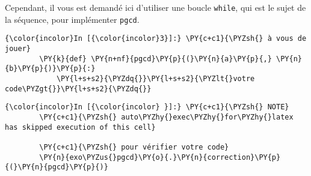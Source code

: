 \begin{Shaded}
\end{Shaded}

Cependant, il vous est demandé ici d'utiliser une boucle \texttt{while},
qui est le sujet de la séquence, pour implémenter \texttt{pgcd}.

    \begin{Verbatim}[commandchars=\\\{\},frame=single,framerule=0.3mm,rulecolor=\color{cellframecolor}]
{\color{incolor}In [{\color{incolor}3}]:} \PY{c+c1}{\PYZsh{} à vous de jouer}
        \PY{k}{def} \PY{n+nf}{pgcd}\PY{p}{(}\PY{n}{a}\PY{p}{,} \PY{n}{b}\PY{p}{)}\PY{p}{:}
            \PY{l+s+s2}{\PYZdq{}}\PY{l+s+s2}{\PYZlt{}votre code\PYZgt{}}\PY{l+s+s2}{\PYZdq{}}
\end{Verbatim}


    \begin{Verbatim}[commandchars=\\\{\},frame=single,framerule=0.3mm,rulecolor=\color{cellframecolor}]
{\color{incolor}In [{\color{incolor} }]:} \PY{c+c1}{\PYZsh{} NOTE}
        \PY{c+c1}{\PYZsh{} auto\PYZhy{}exec\PYZhy{}for\PYZhy{}latex has skipped execution of this cell}
        
        \PY{c+c1}{\PYZsh{} pour vérifier votre code}
        \PY{n}{exo\PYZus{}pgcd}\PY{o}{.}\PY{n}{correction}\PY{p}{(}\PY{n}{pgcd}\PY{p}{)}
\end{Verbatim}



    
    
    
